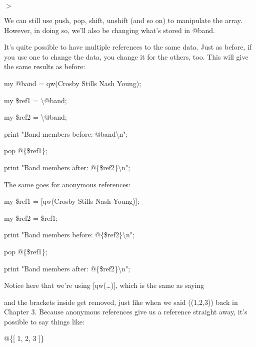 \documentclass[a4paper,11pt]{book}
\begin{document}
\noindent $>$

\noindent 

\noindent We can still use push, pop, shift, unshift (and so on) to manipulate the array. However, in doing so, we'll also be changing what's stored in @band.

\noindent 

\noindent It's quite possible to have multiple references to the same data. Just as before, if you use one to change the data, you change it for the others, too. This will give the same results as before:

\noindent 

\noindent my @band = qw(Crosby Stills Nash Young);

\noindent my \$ref1 = \textbackslash @band;

\noindent my \$ref2 = \textbackslash @band;

\noindent print "Band members before: @band\textbackslash n";

\noindent pop @\{\$ref1\};

\noindent print "Band members after: @\{\$ref2\}\textbackslash n";

\noindent 

\noindent The same goes for anonymous references:

\noindent 

\noindent my \$ref1 = [qw(Crosby Stills Nash Young)];

\noindent my \$ref2 = \$ref1;

\noindent print "Band members before: @\{\$ref2\}\textbackslash n";

\noindent pop @\{\$ref1\};

\noindent print "Band members after: @\{\$ref2\}\textbackslash n";

\noindent 

\noindent Notice here that we're using [qw(\dots )], which is the same as saying

\noindent 


\noindent 

\noindent and the brackets inside get removed, just like when we said ((1,2,3)) back in Chapter 3. Because anonymous references give us a reference straight away, it's possible to say things like:

\noindent 

\noindent @\{[ 1, 2, 3 ]\}

\noindent 
\end{document}
